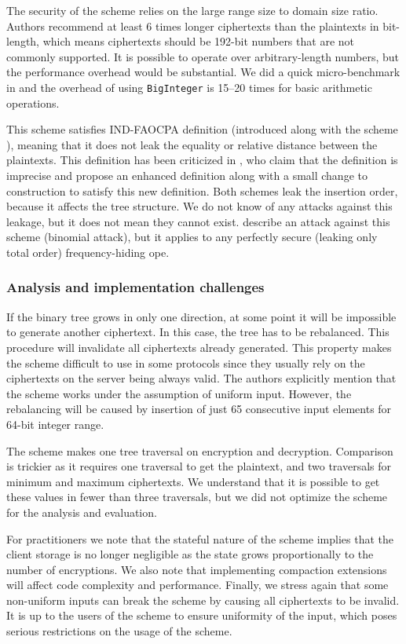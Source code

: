		The security of the scheme relies on the large range size to domain size ratio.
		Authors recommend at least 6 times longer ciphertexts than the plaintexts in bit-length, which means ciphertexts should be 192-bit numbers that are not commonly supported.
		It is possible to operate over arbitrary-length numbers, but the performance overhead would be substantial.
		We did a quick micro-benchmark in {\Csharp} and the overhead of using \texttt{BigInteger} is 15--20 times for basic arithmetic operations.

		This scheme satisfies IND-FAOCPA definition (introduced along with the scheme \cite{fh-ope}), meaning that it does not leak the equality or relative distance between the plaintexts.
		This definition has been criticized in \cite{florian-def-critique}, who claim that the definition is imprecise and propose an enhanced definition along with a small change to construction to satisfy this new definition.
		Both schemes leak the insertion order, because it affects the tree structure.
		We do not know of any attacks against this leakage, but it does not mean they cannot exist.
		\textcite{leakage-abuse-grubs-2017} describe an attack against this scheme (binomial attack), but it applies to any perfectly secure (leaking only total order) frequency-hiding \acrshort{ope}.

	\subsubsection{Analysis and implementation challenges}

		If the binary tree grows in only one direction, at some point it will be impossible to generate another ciphertext.
		In this case, the tree has to be rebalanced.
		This procedure will invalidate all ciphertexts already generated.
		This property makes the scheme difficult to use in some protocols since they usually rely on the ciphertexts on the server being always valid.
		The authors explicitly mention that the scheme works under the assumption of uniform input.
		However, the rebalancing will be caused by insertion of just 65 consecutive input elements for 64-bit integer range.

		The scheme makes one tree traversal on encryption and decryption.
		Comparison is trickier as it requires one traversal to get the plaintext, and two traversals for minimum and maximum ciphertexts.
		We understand that it is possible to get these values in fewer than three traversals, but we did not optimize the scheme for the analysis and evaluation.

		For practitioners we note that the stateful nature of the scheme implies that the client storage is no longer negligible as the state grows proportionally to the number of encryptions.
		We also note that implementing compaction extensions will affect code complexity and performance.
		Finally, we stress again that some non-uniform inputs can break the scheme by causing all ciphertexts to be invalid.
		It is up to the users of the scheme to ensure uniformity of the input, which poses serious restrictions on the usage of the scheme.
